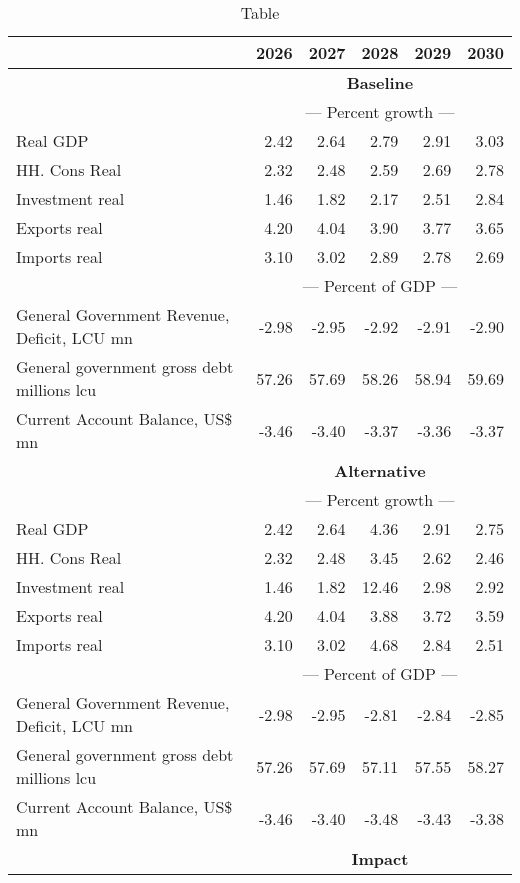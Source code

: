 \documentclass{article}
\begin{document}
\begin{table}[ht]
\caption{Table}
\begin{tabular}{lrrrrr}
\toprule
 & 2026 & 2027 & 2028 & 2029 & 2030 \\
\midrule
&\multicolumn{5}{c}{{\large \textbf{Baseline}}}                          \\
&\multicolumn{5}{c}{{---  Percent growth ---}}                          \\
Real GDP & 2.42 & 2.64 & 2.79 & 2.91 & 3.03 \\
HH. Cons Real & 2.32 & 2.48 & 2.59 & 2.69 & 2.78 \\
Investment real & 1.46 & 1.82 & 2.17 & 2.51 & 2.84 \\
Exports real & 4.20 & 4.04 & 3.90 & 3.77 & 3.65 \\
Imports real & 3.10 & 3.02 & 2.89 & 2.78 & 2.69 \\
&\multicolumn{5}{c}{{---  Percent of GDP ---}}                          \\
General Government Revenue, Deficit, LCU mn & -2.98 & -2.95 & -2.92 & -2.91 & -2.90 \\
General government gross debt millions lcu & 57.26 & 57.69 & 58.26 & 58.94 & 59.69 \\
Current Account Balance, US\$ mn & -3.46 & -3.40 & -3.37 & -3.36 & -3.37 \\
&\multicolumn{5}{c}{{\large \textbf{Alternative}}}                          \\
&\multicolumn{5}{c}{{---  Percent growth ---}}                          \\
Real GDP & 2.42 & 2.64 & 4.36 & 2.91 & 2.75 \\
HH. Cons Real & 2.32 & 2.48 & 3.45 & 2.62 & 2.46 \\
Investment real & 1.46 & 1.82 & 12.46 & 2.98 & 2.92 \\
Exports real & 4.20 & 4.04 & 3.88 & 3.72 & 3.59 \\
Imports real & 3.10 & 3.02 & 4.68 & 2.84 & 2.51 \\
&\multicolumn{5}{c}{{---  Percent of GDP ---}}                          \\
General Government Revenue, Deficit, LCU mn & -2.98 & -2.95 & -2.81 & -2.84 & -2.85 \\
General government gross debt millions lcu & 57.26 & 57.69 & 57.11 & 57.55 & 58.27 \\
Current Account Balance, US\$ mn & -3.46 & -3.40 & -3.48 & -3.43 & -3.38 \\
&\multicolumn{5}{c}{{\large \textbf{Impact}}}                          \\

\end{tabular}
\end{table}
\end{document}
